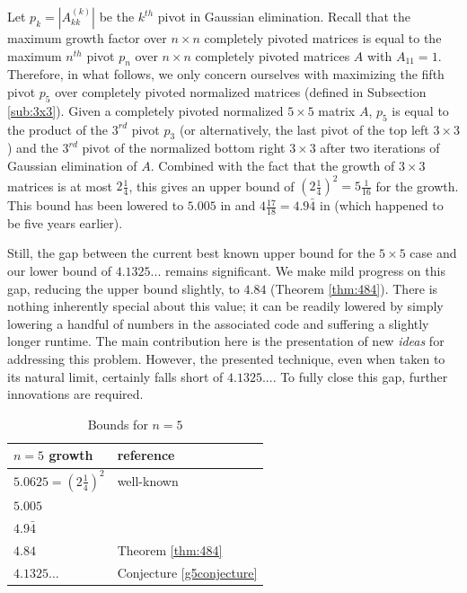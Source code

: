 \documentclass[reqno]{amsart}
\numberwithin{equation}{section}
\begin{document}
Let $p_k = |A_{kk}^{(k)}|$ be the $k^{th}$ pivot in Gaussian elimination. Recall that the maximum growth factor over $n \times n$ completely pivoted matrices is equal to the maximum $n^{th}$ pivot $p_n$ over $n \times n$ completely pivoted matrices $A$ with $A_{11} = 1$. Therefore, in what follows, we only concern ourselves with maximizing the fifth pivot $p_5$ over  completely pivoted normalized matrices (defined in Subsection \ref{sub:3x3}). Given a  completely pivoted normalized $5 \times 5$ matrix $A$, $p_5$ is equal to the product of the $3^{rd}$ pivot $p_3$ (or alternatively, the last pivot of the top left $3 \times 3$) and the $3^{rd}$ pivot of the normalized bottom right $3 \times 3$ after two iterations of Gaussian elimination of $A$. Combined with the fact that the growth of $3 \times 3$ matrices is at most $2 \frac 14$, this gives an upper bound of $(2\frac 14)^2 = 5\frac{1}{16}$ for the growth. This bound has been lowered to $5.005$ in \cite{cohen1974note} and $4\frac{17}{18} = 4.9\bar{4}$ in \cite{tornheim1969maximum} (which happened to be five years earlier).

Still, the gap between the current best known upper bound for the $5 \times 5$ case and our lower bound of $4.1325...$ remains significant. We make mild progress on this gap, reducing the upper bound slightly, to $4.84$ (Theorem \ref{thm:484}). There is nothing inherently special about this value; it can be readily lowered by simply lowering a handful of numbers in the associated code and suffering a slightly longer runtime. The main contribution here is the presentation of new \emph{ideas} for addressing this problem. However, the presented technique, even when taken to its natural limit, certainly falls short of $4.1325...$. To fully close this gap, further innovations are required.

\begin{table}[t]
    \centering
    \caption{Bounds for $n = 5$}
    \label{tab:growth}
    \begin{tabular}{|l|l|}
        \hline
        $n =5 $ growth & reference   \\  \hline      
        $5.0625 = (2 \frac 14 )^2$ \phantom{\huge I} & well-known \\
        $5.005$ & \cite[1974]{cohen1974note} \\
        $4.9\bar{4}$ & \cite[1969]{tornheim1969maximum} \\
        $4.84$ & Theorem \ref{thm:484} \\
        $4.1325\dots$  & Conjecture \ref{g5conjecture} \\
        \hline
    \end{tabular}
\end{table}
\end{document}
